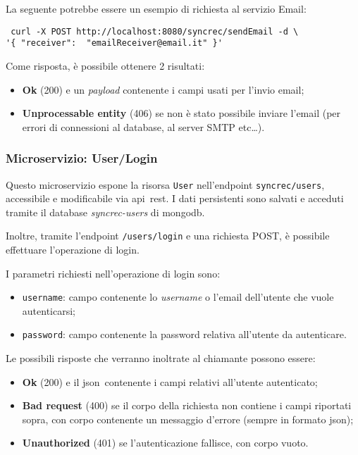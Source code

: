 La seguente potrebbe essere un esempio di richiesta al servizio Email:

\begin{tcolorbox}
	\begin{verbatim} curl -X POST http://localhost:8080/syncrec/sendEmail -d \
'{ "receiver":  "emailReceiver@email.it" }'
	\end{verbatim}
\end{tcolorbox}

Come risposta, è possibile ottenere 2 risultati:
\begin{itemize}
	\item \textbf{Ok} (200) e un \textit{payload} contenente i campi usati
	per l'invio email;
	\item \textbf{Unprocessable entity} (406) se non è stato possibile inviare l'email (per errori di connessioni al database, al server SMTP etc\dots).
\end{itemize}

\subsubsection{Microservizio: User/Login}

Questo microservizio espone la risorsa \texttt{User} nell'endpoint
\texttt{syncrec/users}, accessibile e modificabile via \gls{api}\gloss\ \acrshort{rest}. I dati persistenti sono salvati e acceduti tramite il database \textit{syncrec-users} di
\gls{mongodb}\gloss.

Inoltre, tramite l'endpoint \texttt{/users/login} e una richiesta POST,
è possibile effettuare l'operazione di login.

I parametri richiesti nell'operazione di login sono:
\begin{itemize}
	\item \texttt{username}: campo contenente lo \textit{username} o l'email dell'utente che vuole autenticarsi;
	\item \texttt{password}: campo contenente la password relativa all'utente da autenticare.
\end{itemize}

Le possibili risposte che verranno inoltrate al chiamante possono essere:
\begin{itemize}
	\item \textbf{Ok} (200) e il \acrshort{json}\gloss\ contenente i campi relativi all'utente autenticato;
	\item \textbf{Bad request} (400) se il corpo della richiesta non contiene i campi riportati sopra, con corpo contenente un messaggio d'errore (sempre in formato \acrshort{json}\gloss);
	\item \textbf{Unauthorized} (401) se l'autenticazione fallisce, con corpo vuoto.
\end{itemize}

